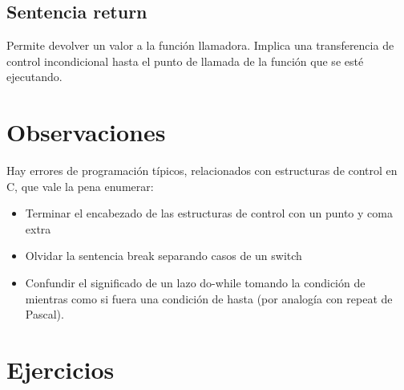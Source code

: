 \subsection{Sentencia return}
Permite devolver un valor a la función llamadora. Implica una transferencia de
control incondicional hasta el punto de llamada de la función que se esté
ejecutando.

\section{Observaciones}
Hay errores de programación típicos, relacionados con estructuras de control en
C, que vale la pena enumerar:
\begin{itemize}
	\item Terminar el encabezado de las estructuras de control con un punto y coma
      extra
    \item Olvidar la sentencia break separando casos de un switch
    \item Confundir el significado de un lazo do-while tomando la condición de
      mientras como si fuera una condición de hasta (por analogía con repeat de
      Pascal).
\end{itemize}
    
\section{Ejercicios}


